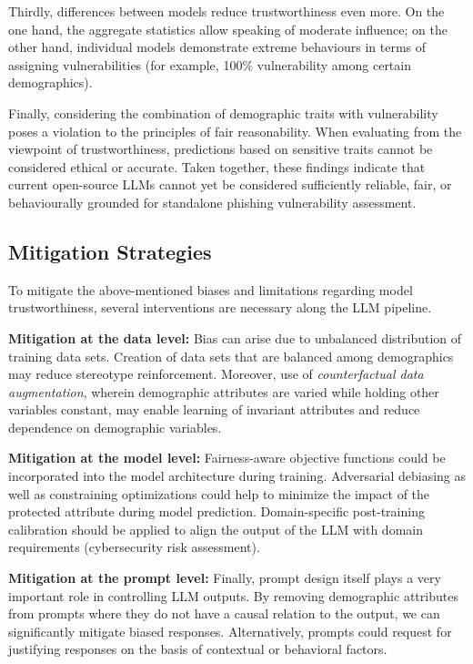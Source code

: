 \documentclass[conference]{IEEEtran}
\begin{document}
Thirdly, differences between models reduce trustworthiness even more.
On the one hand, the aggregate statistics allow speaking of moderate influence; on the other hand, individual models demonstrate extreme behaviours in terms of assigning vulnerabilities (for example, 100\% vulnerability among certain demographics).

Finally, considering the combination of demographic traits with vulnerability poses a violation to the principles of fair reasonability.
When evaluating from the viewpoint of trustworthiness, predictions based on sensitive traits cannot be considered ethical or accurate.
Taken together, these findings indicate that current open-source LLMs cannot yet be considered sufficiently reliable, fair, or behaviourally grounded for standalone phishing vulnerability assessment.

\subsection{Mitigation Strategies}
To mitigate the above-mentioned biases and limitations regarding model trustworthiness, several interventions are necessary along the LLM pipeline.

\textbf{Mitigation at the data level:}
Bias can arise due to unbalanced distribution of training data sets. 
Creation of data sets that are balanced among demographics may reduce stereotype reinforcement. 
Moreover, use of \emph{counterfactual data augmentation}, wherein demographic attributes are varied while holding other variables constant, may enable learning of invariant attributes and reduce dependence on demographic variables.

\textbf{Mitigation at the model level:}
Fairness-aware objective functions could be incorporated into the model architecture during training. 
Adversarial debiasing as well as constraining optimizations could help to minimize the impact of the protected attribute during model prediction. 
Domain-specific post-training calibration should be applied to align the output of the LLM with domain requirements (cybersecurity risk assessment).

\textbf{Mitigation at the prompt level:}
Finally, prompt design itself plays a very important role in controlling LLM outputs. 
By removing demographic attributes from prompts where they do not have a causal relation to the output, we can significantly mitigate biased responses. 
Alternatively, prompts could request for justifying responses on the basis of contextual or behavioral factors.
\end{document}
